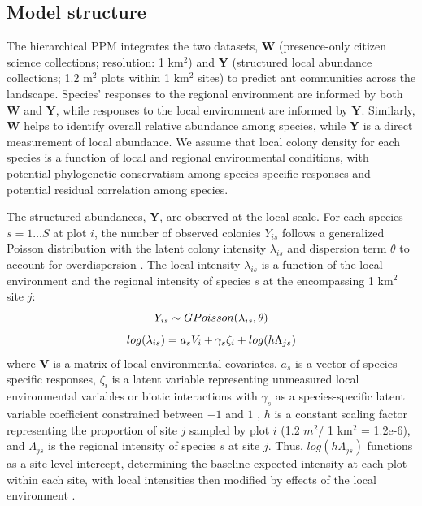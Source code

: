 \documentclass[preprint,final,times,12pt,3p]{elsarticle}
\begin{document}
\subsection{Model structure}
The hierarchical PPM integrates the two datasets, \textbf{W} (presence-only citizen science collections; resolution: 1 km$^2$) and \textbf{Y} (structured local abundance collections; 1.2 m$^2$ plots within 1 km$^2$ sites) to predict ant communities across the landscape. Species' responses to the regional environment are informed by both \textbf{W} and \textbf{Y}, while responses to the local environment are informed by \textbf{Y}. Similarly, \textbf{W} helps to identify overall relative abundance among species, while \textbf{Y} is a direct measurement of local abundance. We assume that local colony density for each species is a function of local and regional environmental conditions, with potential phylogenetic conservatism among species-specific responses and potential residual correlation among species.

The structured abundances, \textbf{Y}, are observed at the local scale. For each species $s=1 \dots S$  at plot $i$, the number of observed colonies $Y_{is}$ follows a generalized Poisson distribution with the latent colony intensity $\lambda_{is}$ and dispersion term $\theta$ to account for overdispersion \citep{Consul1992,Ntzoufras2005,Isaac2019,Miller2019}. The local intensity $\lambda_{is}$ is a function of the local environment and the regional intensity of species $s$ at the encompassing 1 km$^2$ site $j$:
    \begin{equation}
        Y_{is} \sim GPoisson(\lambda_{is}, \theta) \\
        \label{eq:Y_GP}
    \end{equation}
    \begin{equation}
        log(\lambda_{is}) = a_s V_i + \gamma_s \zeta_i + log(h\Lambda_{js}) \\
        \label{eq:lambda}
    \end{equation}
where \textbf{V} is a matrix of local environmental covariates, $a_s$ is a vector of species-specific responses, $\zeta_i$ is a latent variable representing unmeasured local environmental variables or biotic interactions with $\gamma_s$ as a species-specific latent variable coefficient constrained between $-1$ and $1$ \citep{Ovaskainen2016,Caradima2019,Tobler2019}, $h$ is a constant scaling factor representing the proportion of site $j$ sampled by plot $i$ (1.2 $m^2 /$ 1 km$^2$ = 1.2e-6), and $\Lambda_{js}$ is the regional intensity of species $s$ at site $j$. Thus, $log(h\Lambda_{js})$ functions as a site-level intercept, determining the baseline expected intensity at each plot within each site, with local intensities then modified by effects of the local environment \citep{Yamaura2016,Miller2019}.
\end{document}
